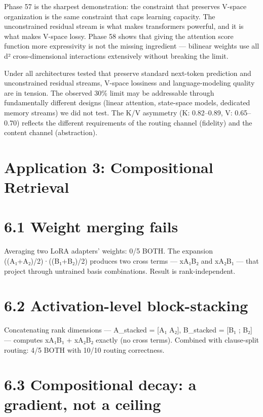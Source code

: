 Phase 57 is the sharpest demonstration: the constraint that preserves V-space organization is the same constraint that caps learning capacity. The unconstrained residual stream is what makes transformers powerful, and it is what makes V-space lossy. Phase 58 shows that giving the attention score function more expressivity is not the missing ingredient --- bilinear weights use all d² cross-dimensional interactions extensively without breaking the limit.

Under all architectures tested that preserve standard next-token prediction and unconstrained residual streams, V-space lossiness and language-modeling quality are in tension. The observed 30\% limit may be addressable through fundamentally different designs (linear attention, state-space models, dedicated memory streams) we did not test. The K/V asymmetry (K: 0.82--0.89, V: 0.65--0.70) reflects the different requirements of the routing channel (fidelity) and the content channel (abstraction).

\section{Application 3: Compositional Retrieval}\label{application-3-compositional-retrieval}

\section{6.1 Weight merging fails}\label{weight-merging-fails}

Averaging two LoRA adapters' weights: 0/5 BOTH. The expansion ((A₁+A₂)/2)·((B₁+B₂)/2) produces two cross terms --- xA₁B₂ and xA₂B₁ --- that project through untrained basis combinations. Result is rank-independent.

\section{6.2 Activation-level block-stacking}\label{activation-level-block-stacking}

Concatenating rank dimensions --- A\_stacked = {[}A₁ \textbar{} A₂{]}, B\_stacked = {[}B₁ ; B₂{]} --- computes xA₁B₁ + xA₂B₂ exactly (no cross terms). Combined with clause-split routing: 4/5 BOTH with 10/10 routing correctness.

\section{6.3 Compositional decay: a gradient, not a ceiling}\label{compositional-decay-a-gradient-not-a-ceiling}

